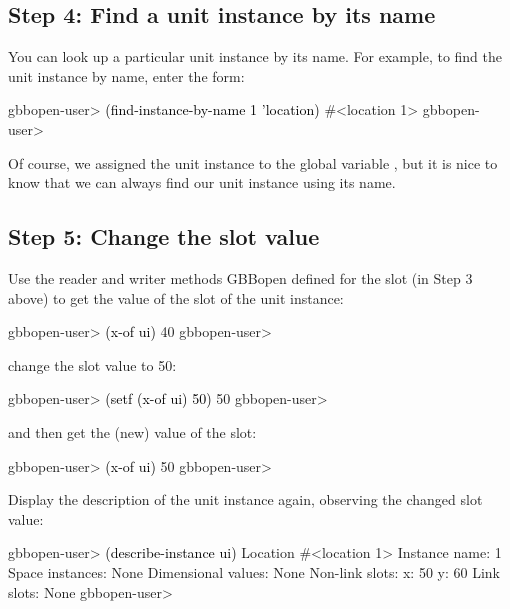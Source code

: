 \documentclass[10pt,twoside,english,pdftex]{article}
\begin{document}
\subsection*{Step 4: Find a unit instance by its name}

%
%
%
You can look up a particular unit instance by its name. For example, to find
the   unit instance by name, enter the form:
%
\W\supp
\begin{example}
\textcolor{darkergray}{%
  gbbopen-user> \textcolor{black}{(find-instance-by-name 1 'location)}
  #<location 1>
  gbbopen-user>}
\end{example}

Of course, we assigned the  unit instance to the global
variable , but it is nice to know that we can always find our unit
instance using its name.

\subsection*{Step 5: Change the  slot value}

%
%
%
%
%
%
%
%
Use the  reader and writer methods GBBopen defined for the
 slot (in Step 3 above) to get the value of the  slot of the
unit instance:
%
\W\supp
\begin{example}
\textcolor{darkergray}{%
  gbbopen-user> \textcolor{black}{(x-of ui)}
  40
  gbbopen-user>}
\end{example}
%
change the slot value to 50:
%
\W\supp\notpretop
\begin{example}
\textcolor{darkergray}{%
  gbbopen-user> \textcolor{black}{(setf (x-of ui) 50)}
  50
  gbbopen-user>}
\end{example}
%
and then get the (new) value of the  slot:
%
\W\supp\notpretop
\begin{example}
\textcolor{darkergray}{%
  gbbopen-user> \textcolor{black}{(x-of ui)}
  50
  gbbopen-user>}
\end{example}

%
Display the description of the  unit instance again,
observing the changed  slot value:
%
\begin{example}
\W\supp
\textcolor{darkergray}{%
  gbbopen-user> \textcolor{black}{(describe-instance ui)}
  Location #<location 1>
    Instance name: 1
    Space instances: None
    Dimensional values: None
    Non-link slots:
      x:  50
      y:  60
    Link slots: None
  gbbopen-user>}
\end{example}
\end{document}
